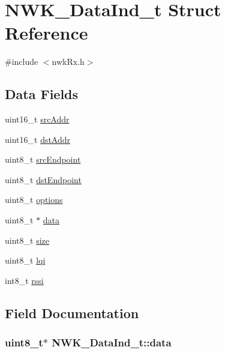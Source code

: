 \hypertarget{struct_n_w_k___data_ind__t}{\section{N\-W\-K\-\_\-\-Data\-Ind\-\_\-t Struct Reference}
\label{struct_n_w_k___data_ind__t}
}


{\ttfamily \#include $<$nwk\-Rx.\-h$>$}

\subsection*{Data Fields}
\begin{DoxyCompactItemize}
\item 
uint16\-\_\-t \hyperlink{struct_n_w_k___data_ind__t_a4105835ce35320f6ed3da328563d165b}{src\-Addr}
\item 
uint16\-\_\-t \hyperlink{struct_n_w_k___data_ind__t_a5177c8f65ff641439e61e637d7fb8cd0}{dst\-Addr}
\item 
uint8\-\_\-t \hyperlink{struct_n_w_k___data_ind__t_a7c818ed76491eb59d09aa7be7bf46a72}{src\-Endpoint}
\item 
uint8\-\_\-t \hyperlink{struct_n_w_k___data_ind__t_a0c390867d79e357c2d0733b4d1ab2e0e}{dst\-Endpoint}
\item 
uint8\-\_\-t \hyperlink{struct_n_w_k___data_ind__t_aab24e18de358fd61139a53ef6e51e286}{options}
\item 
uint8\-\_\-t $\ast$ \hyperlink{struct_n_w_k___data_ind__t_a90e3baa83f041c2f26a36c23e79c93ea}{data}
\item 
uint8\-\_\-t \hyperlink{struct_n_w_k___data_ind__t_a73c2dc888e0d42b76e23842054f7b179}{size}
\item 
uint8\-\_\-t \hyperlink{struct_n_w_k___data_ind__t_a038eb20c6ccd031895be95cc15edacea}{lqi}
\item 
int8\-\_\-t \hyperlink{struct_n_w_k___data_ind__t_af1caf9632bf2425ab22ecd540204a190}{rssi}
\end{DoxyCompactItemize}


\subsection{Field Documentation}
\hypertarget{struct_n_w_k___data_ind__t_a90e3baa83f041c2f26a36c23e79c93ea}{
\subsubsection[{data}]{\setlength{\rightskip}{0pt plus 5cm}uint8\-\_\-t$\ast$ N\-W\-K\-\_\-\-Data\-Ind\-\_\-t\-::data}}\label{struct_n_w_k___data_ind__t_a90e3baa83f041c2f26a36c23e79c93ea}



